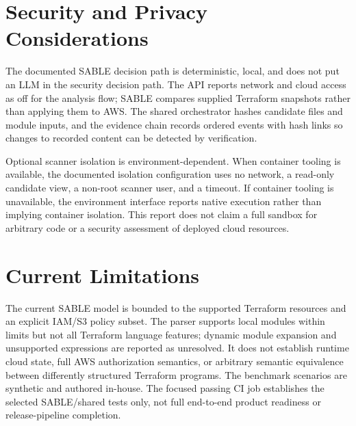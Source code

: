 \section{Security and Privacy Considerations}

The documented SABLE decision path is deterministic, local, and does not put an LLM in the security decision path. The API reports network and cloud access as off for the analysis flow; SABLE compares supplied Terraform snapshots rather than applying them to AWS. The shared orchestrator hashes candidate files and module inputs, and the evidence chain records ordered events with hash links so changes to recorded content can be detected by verification.

Optional scanner isolation is environment-dependent. When container tooling is available, the documented isolation configuration uses no network, a read-only candidate view, a non-root scanner user, and a timeout. If container tooling is unavailable, the environment interface reports native execution rather than implying container isolation. This report does not claim a full sandbox for arbitrary code or a security assessment of deployed cloud resources.

\section{Current Limitations}

The current SABLE model is bounded to the supported Terraform resources and an explicit IAM/S3 policy subset. The parser supports local modules within limits but not all Terraform language features; dynamic module expansion and unsupported expressions are reported as unresolved. It does not establish runtime cloud state, full AWS authorization semantics, or arbitrary semantic equivalence between differently structured Terraform programs. The benchmark scenarios are synthetic and authored in-house. The focused passing CI job establishes the selected SABLE/shared tests only, not full end-to-end product readiness or release-pipeline completion.
